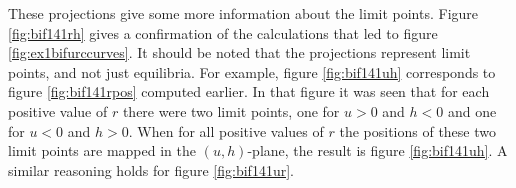 These projections give some more information about the limit points. Figure \ref{fig:bif141rh} gives a confirmation of the calculations that led to figure \ref{fig:ex1bifurccurves}. It should be noted that the projections represent limit points, and not just equilibria. For example, figure \ref{fig:bif141uh} corresponds to figure \ref{fig:bif141rpos} computed earlier. In that figure it was seen that for each positive value of $r$ there were two limit points, one for $u>0$ and $h<0$ and one for $u<0$ and $h>0$. When for all positive values of $r$ the positions of these two limit points are mapped in the $(u,h)$-plane, the result is figure \ref{fig:bif141uh}. A similar reasoning holds for figure \ref{fig:bif141ur}.
\begin{figure}[htp]
\centering
{}

\end{figure}
